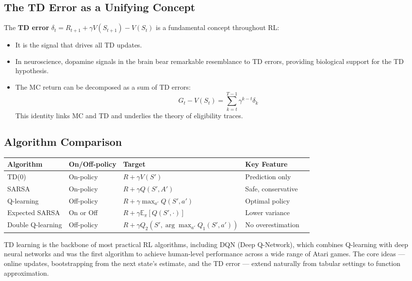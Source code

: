 \documentclass[11pt,a4paper]{article}
\theoremstyle{definition}
\theoremstyle{plain}
\theoremstyle{remark}
\begin{document}
\subsection{The TD Error as a Unifying Concept}

The \textbf{TD error} $\delta_t = R_{t+1} + \gamma V(S_{t+1}) - V(S_t)$ is a fundamental concept throughout RL:
\begin{itemize}
    \item It is the signal that drives all TD updates.
    \item In neuroscience, dopamine signals in the brain bear remarkable resemblance to TD errors, providing biological support for the TD hypothesis.
    \item The MC return can be decomposed as a sum of TD errors:
    \[
        G_t - V(S_t) = \sum_{k=t}^{T-1} \gamma^{k-t} \delta_k
    \]
    This identity links MC and TD and underlies the theory of eligibility traces.
\end{itemize}

\subsection{Algorithm Comparison}

\begin{center}
\begin{tabular}{lllll}
\hline
\textbf{Algorithm} & \textbf{On/Off-policy} & \textbf{Target} & \textbf{Key Feature} \\
\hline
TD(0)             & On-policy  & $R + \gamma V(S')$                             & Prediction only \\
SARSA             & On-policy  & $R + \gamma Q(S', A')$                         & Safe, conservative \\
Q-learning        & Off-policy & $R + \gamma \max_{a'} Q(S', a')$               & Optimal policy \\
Expected SARSA    & On or Off  & $R + \gamma \mathbb{E}_\pi[Q(S', \cdot)]$      & Lower variance \\
Double Q-learning & Off-policy & $R + \gamma Q_2(S', \arg\max_{a'} Q_1(S',a'))$ & No overestimation \\
\hline
\end{tabular}
\end{center}

\begin{tcolorbox}[colback=green!5!white, colframe=green!60!black, title={Why TD Learning Matters}]
TD learning is the backbone of most practical RL algorithms, including DQN (Deep Q-Network), which combines Q-learning with deep neural networks and was the first algorithm to achieve human-level performance across a wide range of Atari games. The core ideas — online updates, bootstrapping from the next state's estimate, and the TD error — extend naturally from tabular settings to function approximation.
\end{tcolorbox}
\end{document}
